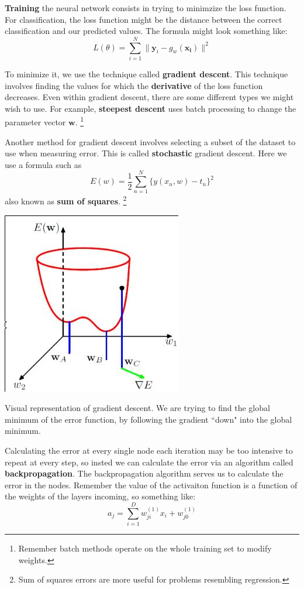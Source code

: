 \documentclass{tufte-handout}
\begin{document}
\textbf{Training} the neural network consists in trying to minimzize the loss function. 
For classification, the loss function might be the distance between the correct classification
	and our predicted values.
The formula might look something like:
\[ L(\theta) = \sum_{i=1}^{N}\|\mathbf{y}_{i} -  g_{w}(\mathbf{x_{i}})\|^{2}\]

To minimize it, we use the technique called \textbf{gradient descent}. 
This technique involves finding the values for which the \textbf{derivative} of the loss function decreases. 
Even within gradient descent, there are some different types we might wish to use. 
For example, \textbf{steepest descent} uses batch processing to change the parameter vector $\mathbf{w}$.
\footnote{Remember batch methods operate on the whole training set to modify weights.}

Another method for gradient descent involves selecting a subset of the dataset to use when measuring 
	error.
This is called \textbf{stochastic} gradient descent. 
Here we use a formula such as 
\[E(w) = \frac{1}{2}\sum_{n=1}^{N}\{y(x_{n}, w) - t_{n}\}^{2}\]
also known as \textbf{sum of squares}.
\footnote{Sum of squares errors are more useful for problems resembling regression.}
\begin{marginfigure}
	\includegraphics[scale=0.3]{gradient_descent}
	\caption{Visual representation of gradient descent. We are trying to find the global
		minimum of the error function, by following the gradient ``down" into the global 
		minimum.}
\end{marginfigure}

Calculating the error at every single node each iteration may be too intensive to repeat at every step,
	so insted we can calculate the error via an algorithm called \textbf{backpropagation}.
The backpropagation algorithm serves us to calculate the error in the nodes. Remember the value of
the activaiton function is a function of the weights of the layers incoming, so something like:
\[ a_{j} = \sum_{i=1}^{D}w^{(1)}_{ji}x_{i} + w_{j0}^{(1)}\]
\end{document}
